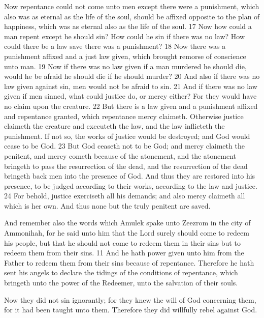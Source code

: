 \begin{compactdesc}
			\item[Alma 42:16--24] Now repentance could not come unto men except there were a punishment, which also was as eternal as the life of the soul, should be affixed opposite to the plan of happiness, which was as eternal also as the life of the soul. 17 Now how could a man repent except he should sin? How could he sin if there was no law? How could there be a law save there was a punishment? 18 Now there was a punishment affixed and a just law given, which brought remorse of conscience unto man. 19 Now if there was no law given if a man murdered he should die, would he be afraid he should die if he should murder? 20 And also if there was no law given against sin, men would not be afraid to sin. 21 And if there was no law given if men sinned, what could justice do, or mercy either? For they would have no claim upon the creature. 22 But there is a law given and a punishment affixed and repentance granted, which repentance mercy claimeth. Otherwise justice claimeth the creature and executeth the law, and the law inflicteth the punishment. If not so, the works of justice would be destroyed; and God would cease to be God. 23 But God ceaseth not to be God; and mercy claimeth the penitent, and mercy cometh because of the atonement, and the atonement bringeth to pass the resurrection of the dead, and the resurrection of the dead bringeth back men into the presence of God. And thus they are restored into his presence, to be judged according to their works, according to the law and justice. 24 For behold, justice exerciseth all his demands; and also mercy claimeth all which is her own. And thus none but the truly penitent are saved.
			\item[{\hyperref[ALMA-45-16]{Alma 45:16}}]
			\item[Helaman 5:10--11] And remember also the words which Amulek spake unto Zeezrom in the city of Ammonihah, for he said unto him that the Lord surely should come to redeem his people, but that he should not come to redeem them in their sins but to redeem them from their sins. 11 And he hath power given unto him from the Father to redeem them from their sins because of repentance. Therefore he hath sent his angels to declare the tidings of the conditions of repentance, which bringeth unto the power of the Redeemer, unto the salvation of their souls.
			\item[3 Nephi 6:18] Now they did not sin ignorantly; for they knew the will of God concerning them, for it had been taught unto them. Therefore they did willfully rebel against God.

\end{compactdesc}
